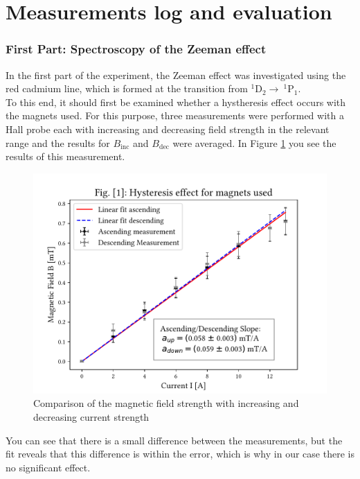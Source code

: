 \section{Measurements log and evaluation}
\subsubsection{First Part: Spectroscopy of the Zeeman effect}
In the first part of the experiment, the Zeeman effect was investigated using the red cadmium line, which is formed at the transition from $^1\text{D}_2\rightarrow ~^1\text{P}_1$.\\

To this end, it should first be examined whether a hystheresis effect occurs with the magnets used.
For this purpose, three measurements were performed with a Hall probe each with increasing and decreasing field strength in the relevant range and the results for $B_\text{inc}$ and $B_\text{dec}$ were averaged.
In Figure \ref{fig:hystheresis} you see the results of this measurement.
\begin{figure}[ht]
\centering
\includegraphics[scale=.55]{images//hystheresis.pdf}
\caption{Comparison of the magnetic field strength with increasing and decreasing current strength}
\label{fig:hystheresis}
\end{figure}
You can see that there is a small difference between the measurements, but the fit reveals that this difference is within the error, which is why in our case there is no significant effect.\\

